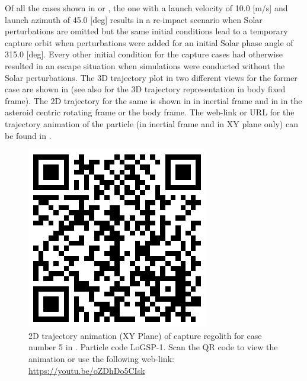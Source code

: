 Of all the cases shown in  or , the one with a launch velocity of 10.0 [m/s] and launch azimuth of 45.0 [deg] results in a re-impact scenario when Solar perturbations are omitted but the same initial conditions lead to a temporary capture orbit when perturbations were added for an initial Solar phase angle of 315.0 [deg]. Every other initial condition for the capture cases had otherwise resulted in an escape situation when simulations were conducted without the Solar perturbations. The 3D trajectory plot in two different views for the former case are shown in  (see  also for the 3D trajectory representation in body fixed frame). The 2D trajectory for the same is shown in  in inertial frame and in  in the asteroid centric rotating frame or the body frame. The web-link or URL for the trajectory animation of the particle (in inertial frame and in XY plane only) can be found in .
\begin{figure}[htb]
\centering
\captionsetup{justification=centering}
\includegraphics[scale=0.25]{longest_edge_perturbations/3.2Density_1cmSize/qrcode_10ms_45Azimuth_315SolarPhase.png}
\caption{2D trajectory animation (XY Plane) of capture regolith for case number 5 in . Particle code LoGSP-1. Scan the QR code to view the animation or use the following web-link: \url{https://youtu.be/oZDhDo5CIsk}}
\label{fig:LoGSP_1_capture_case_5_2d_trajectory_animation}
\end{figure}
